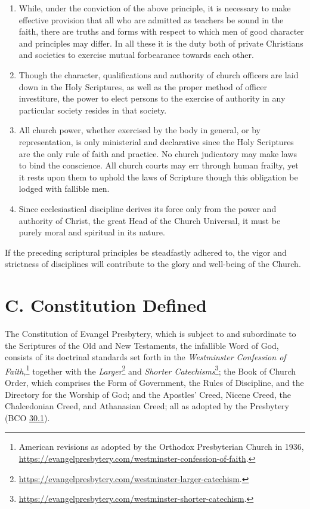 \documentclass[
]{book}
\begin{document}
\begin{enumerate}
\def\labelenumi{\arabic{enumi}.}
\setcounter{enumi}{4}
\item
  While, under the conviction of the above principle, it is necessary to make effective provision that all who are admitted as teachers be sound in the faith, there are truths and forms with respect to which men of good character and principles may differ. In all these it is the duty both of private Christians and societies to exercise mutual forbearance towards each other.
\item
  Though the character, qualifications and authority of church officers are laid down in the Holy Scriptures, as well as the proper method of officer investiture, the power to elect persons to the exercise of authority in any particular society resides in that society.
\item
  All church power, whether exercised by the body in general, or by representation, is only ministerial and declarative since the Holy Scriptures are the only rule of faith and practice. No church judicatory may make laws to bind the conscience. All church courts may err through human frailty, yet it rests upon them to uphold the laws of Scripture though this obligation be lodged with fallible men.
\item
  Since ecclesiastical discipline derives its force only from the power and authority of Christ, the great Head of the Church Universal, it must be purely moral and spiritual in its nature.
\end{enumerate}

If the preceding scriptural principles be steadfastly adhered to, the vigor and strictness of disciplines will contribute to the glory and well-being of the Church.

\hypertarget{c.-constitution-defined}{%
\section*{C. Constitution Defined}\label{c.-constitution-defined}}

The Constitution of Evangel Presbytery, which is subject to and subordinate to the Scriptures of the Old and New Testaments, the infallible Word of God, consists of its doctrinal standards set forth in the \emph{Westminster Confession of Faith,}\footnote{American revisions as adopted by the Orthodox Presbyterian Church in 1936, \url{https://evangelpresbytery.com/westminster-confession-of-faith}.} together with the \emph{Larger}\footnote{\url{https://evangelpresbytery.com/westminster-larger-catechism}.} and \emph{Shorter Catechisms}\footnote{\url{https://evangelpresbytery.com/westminster-shorter-catechism}.}; the Book of Church Order, which comprises the Form of Government, the Rules of Discipline, and the Directory for the Worship of God; and the Apostles' Creed, Nicene Creed, the Chalcedonian Creed, and Athanasian Creed; all as adopted by the Presbytery (BCO \protect\hyperlink{30.1}{30.1}).
\end{document}
